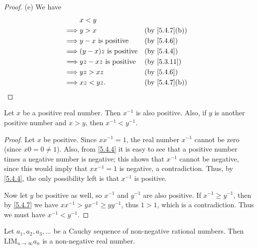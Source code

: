 \begin{proof}{(e)}
  We have
  \begin{align*}
             & x < y                                                         \\
    \implies & y > x                        &  & \text{(by \cref{5.4.7}(b))} \\
    \implies & y - x \text{ is positive}    &  & \text{(by \cref{5.4.6})}    \\
    \implies & (y - x)z \text{ is positive} &  & \text{(by \cref{5.4.4})}    \\
    \implies & yz - xz \text{ is positive}  &  & \text{(by \cref{5.3.11})}   \\
    \implies & yz > xz                      &  & \text{(by \cref{5.4.6})}    \\
    \implies & xz < yz.                     &  & \text{(by \cref{5.4.7}(b))}
  \end{align*}
\end{proof}

\begin{prop}\label{5.4.8}
  Let \(x\) be a positive real number.
  Then \(x^{-1}\) is also positive.
  Also, if \(y\) is another positive number and \(x > y\), then \(x^{-1} < y^{-1}\).
\end{prop}

\begin{proof}
  Let \(x\) be positive.
  Since \(xx^{-1} = 1\), the real number \(x^{-1}\) cannot be zero (since \(x0 = 0 \neq 1\)).
  Also, from \cref{5.4.4} it is easy to see that a positive number times a negative number is negative;
  this shows that \(x^{-1}\) cannot be negative, since this would imply that \(xx^{-1} = 1\) is negative, a contradiction.
  Thus, by \cref{5.4.4}, the only possibility left is that \(x^{-1}\) is positive.

  Now let \(y\) be positive as well, so \(x^{-1}\) and \(y^{-1}\) are also positive.
  If \(x^{-1} \geq y^{-1}\), then by \cref{5.4.7} we have \(xx^{-1} > yx^{-1} \geq yy^{-1}\), thus \(1 > 1\), which is a contradiction.
  Thus we must have \(x^{-1} < y^{-1}\).
\end{proof}

\begin{prop}\label{5.4.9}
  Let \(a_1, a_2, a_3, \dots\) be a Cauchy sequence of non-negative rational numbers.
  Then \(\text{LIM}_{n \to \infty} a_n\) is a non-negative real number.
\end{prop}

